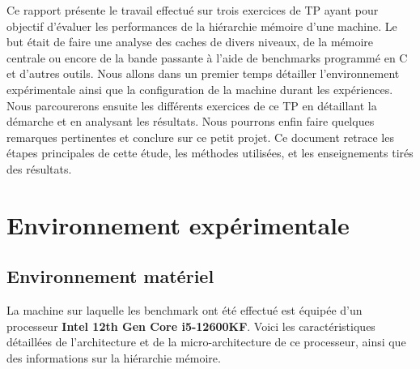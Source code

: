 \documentclass{rapport}
\begin{document}
        Ce rapport présente le travail effectué sur trois exercices de TP ayant pour objectif d'évaluer les performances de la hiérarchie mémoire d’une machine. Le but était de faire une analyse des caches de divers niveaux, de la mémoire centrale ou encore de la bande passante à l'aide de benchmarks programmé en C et d'autres outils.
        Nous allons dans un premier temps détailler l'environnement expérimentale ainsi que la configuration de la machine durant les expériences.
        Nous parcourerons ensuite les différents exercices de ce TP en détaillant la démarche et en analysant les résultats.
        Nous pourrons enfin faire quelques remarques pertinentes et conclure sur ce petit projet.
        Ce document retrace les étapes principales de cette étude, les méthodes utilisées, et les enseignements tirés des résultats.
        
    \section{Environnement expérimentale} 
      
      \subsection{Environnement matériel} 
        La machine sur laquelle les benchmark ont été effectué est équipée d’un processeur \textbf{Intel 12th Gen Core i5-12600KF}. Voici les caractéristiques détaillées de l’architecture et de la micro-architecture de ce processeur, ainsi que des informations sur la hiérarchie mémoire.
        
\end{document}
